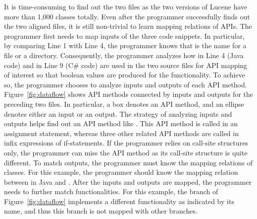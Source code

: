 It is time-consuming to find out the two files as the two versions
of Lucene have more than 1,000 classes totally. Even after the
programmer successfully finds out the two aligned files, it is still
non-trivial to learn mapping relations of APIs. The programmer first
needs to map inputs of the three code snippets. In particular, by
comparing Line 1 with Line 4, the programmer knows that
 is the name for a file or a directory. Consequently,
the programmer analyzes how  in Line 4 (Java code) and
 in Line 9 (C\# code) are used in the two source files
for API mapping of interest so that boolean values are produced for
the functionality. To achieve so, the programmer chooses to analyze
inputs and outputs of each API method. Figure~\ref{fig:dataflow}
shows API methods connected by inputs and outputs for the preceding
two files. In particular, a box denotes an API method, and an
ellipse denotes either an input or an output. The strategy of
analyzing inputs and outputs helps find out an API method like
. This API method is called in
an assignment statement, whereas three other related API methods are
called in infix expressions of if-statements. If the programmer
relies on call-site structures only, the programmer can miss the API
method as its call-site structure is quite different. To match
outputs, the programmer must know the mapping relations of classes.
For this example, the programmer should know the mapping relation
between  in Java and . After
the inputs and outputs are mapped, the programmer needs to further
match functionalities. For this example, the 
branch of Figure~\ref{fig:dataflow} implements a different
functionality as indicated by its name, and thus this branch is not
mapped with other branches.

